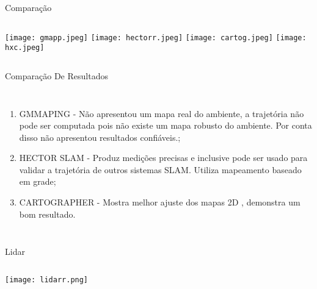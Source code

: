 \begin{frame}[t]{Comparação}
    \transboxout[duration=0.5]
    \begin{columns}
            \texttt{[image: gmapp.jpeg]}
            \texttt{[image: hectorr.jpeg]}
            \texttt{[image: cartog.jpeg]}
            \texttt{[image: hxc.jpeg]}
    \end{columns}
\end{frame}
%
\begin{frame}[t]{Comparação De Resultados}
    \transboxout[duration=0.5]
    \begin{columns}
            \begin{enumerate}
                \item GMMAPING - Não apresentou um mapa real do ambiente, a trajetória não pode ser computada pois não existe um mapa robusto do ambiente. Por conta disso não apresentou resultados confiáveis.;
                \item HECTOR SLAM - Produz medições precisas e inclusive pode ser usado para validar a trajetória de outros sistemas SLAM. Utiliza mapeamento baseado em grade; 
                \item CARTOGRAPHER - Mostra melhor ajuste dos mapas 2D , demonstra um bom resultado. 
            \end{enumerate}
    \end{columns}
\end{frame}
\begin{frame}[t]{Lidar}
    \transboxout[duration=0.5]
    \begin{columns}
            \texttt{[image: lidarr.png]}
    \end{columns}
\end{frame}
